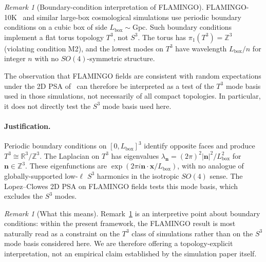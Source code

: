 \documentclass[
  aps,
  prd,
  reprint,
  superscriptaddress,
  nofootinbib,
  longbibliography,
  floatfix,
  amsmath,
  amssymb
]{revtex4-2}
\theoremstyle{plain}
\theoremstyle{definition}
\theoremstyle{remark}
\newtheorem{remark}[theorem]{Remark}
\newcommand{\Sthree}{S^3}
\begin{document}
\begin{remark}[Boundary-condition interpretation of FLAMINGO]
  \label{prop:flamingo}
  FLAMINGO-10K~\cite{Sawala2025} and similar large-box cosmological
  simulations use periodic boundary conditions on a cubic box of side
  $L_{\mathrm{box}}\sim$Gpc. Such boundary conditions implement
  a flat torus topology $T^3$, not $\Sthree$. The torus has
  $\pi_1(T^3)=\mathbb{Z}^3$ (violating condition M2), and the
  lowest modes on $T^3$ have wavelength $L_{\mathrm{box}}/n$ for
  integer $n$ with no $SO(4)$-symmetric structure.

  The observation that FLAMINGO fields are consistent with random
  expectations under the 2D PSA of~\cite{Lopez2026} can therefore be
  interpreted as a test of the $T^3$ mode basis used in those
  simulations, not necessarily of all compact topologies. In
  particular, it does not directly test the $\Sthree$ mode basis used
  here.
\end{remark}
\paragraph{Justification.}
  Periodic boundary conditions on $[0,L_{\mathrm{box}}]^3$ identify
  opposite faces and produce $T^3\cong\mathbb{R}^3/\mathbb{Z}^3$.
  The Laplacian on $T^3$ has eigenvalues
  $\lambda_{\mathbf{n}} = (2\pi)^2|\mathbf{n}|^2/L_{\mathrm{box}}^2$
  for $\mathbf{n}\in\mathbb{Z}^3$. These eigenfunctions are
  $\exp(2\pi i\mathbf{n}\cdot\mathbf{x}/L_{\mathrm{box}})$, with no
  analogue of globally-supported low-$\ell$ $\Sthree$ harmonics in the
  isotropic $SO(4)$ sense. The Lopez--Clowes 2D PSA on FLAMINGO fields
  tests this mode basis, which excludes the $\Sthree$ modes.

\begin{remark}[What this means]
  Remark~\ref{prop:flamingo} is an interpretive point about boundary
  conditions: within the present framework, the FLAMINGO result is most
  naturally read as a constraint on the $T^3$ class of simulations
  rather than on the $\Sthree$ mode basis considered here. We are
  therefore offering a topology-explicit interpretation, not an
  empirical claim established by the simulation paper itself.
\end{remark}
\end{document}
